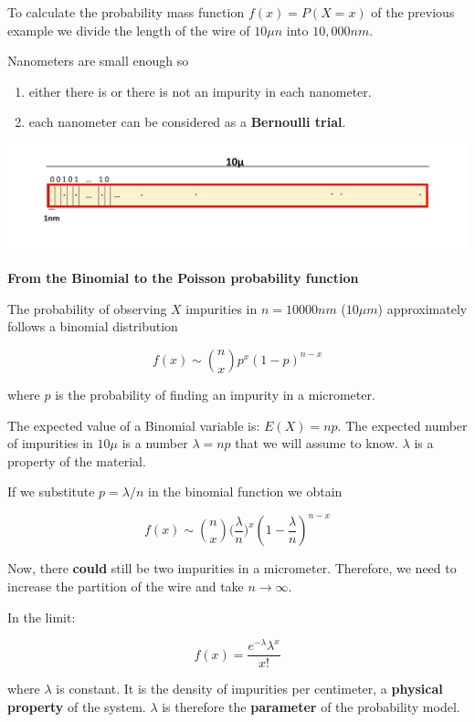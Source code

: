 \documentclass[
]{book}
\begin{document}
To calculate the probability mass function \(f(x)=P(X=x)\) of the previous example we divide the length of the wire of \(10\mu n\) into \(10,000nm\).

Nanometers are small enough so

\begin{enumerate}
\def\labelenumi{\arabic{enumi})}
\item
  either there is or there is not an impurity in each nanometer.
\item
  each nanometer can be considered as a \textbf{Bernoulli trial}.
\end{enumerate}

\includegraphics{./figures/Pois.JPG}

\textbf{From the Binomial to the Poisson probability function}

The probability of observing \(X\) impurities in \(n=10000nm\) (\(10\mu m\)) approximately follows a binomial distribution

\[f(x) \sim \binom n x p^x(1-p)^{n-x}\]

where \(p\) is the probability of finding an impurity in a micrometer.

The expected value of a Binomial variable is:
\(E(X)=np\). The expected number of impurities in \(10\mu\) is a number \(\lambda=np\) that we will assume to know. \(\lambda\) is a property of the material.

If we substitute \(p=\lambda/n\) in the binomial function we obtain

\[f(x) \sim \binom n x \big(\frac{\lambda}{n}\big)^x(1-\frac{\lambda}{n})^{n-x}\]

Now, there \textbf{could} still be two impurities in a micrometer. Therefore, we need to increase the partition of the wire and take \(n \rightarrow \infty\).

In the limit:

\[f(x)= \frac{e^{-\lambda}\lambda^x}{x!}\]

where \(\lambda\) is constant. It is the density of impurities per centimeter, a \textbf{physical property} of the system. \(\lambda\) is therefore the \textbf{parameter} of the probability model.
\end{document}
